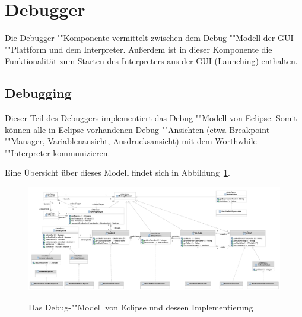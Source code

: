 \section{Debugger}

Die Debugger-""Komponente vermittelt zwischen dem Debug-""Modell der GUI-""Plattform und dem Interpreter. Außerdem ist in dieser Komponente die Funktionalität zum Starten des Interpreters aus der GUI (Launching) enthalten.

\subsection{Debugging}

Dieser Teil des Debuggers implementiert das Debug-""Modell von Eclipse. Somit können alle in Eclipse vorhandenen Debug-""Ansichten (etwa Breakpoint-""Manager, Variablenansicht, Ausdrucksansicht) mit dem Worthwhile-""Interpreter kommunizieren.

Eine Übersicht über dieses Modell findet sich in Abbildung~\ref{debugmodel}.

\begin{landscape}%
\begin{figure}
	\caption[B]{Das Debug-""Modell von Eclipse und dessen Implementierung\footnotemark}
	\centering
	\includegraphics[height=\textheight]{diagrams/debugmodel.pdf}
	\label{debugmodel}
\end{figure}
\end{landscape}

